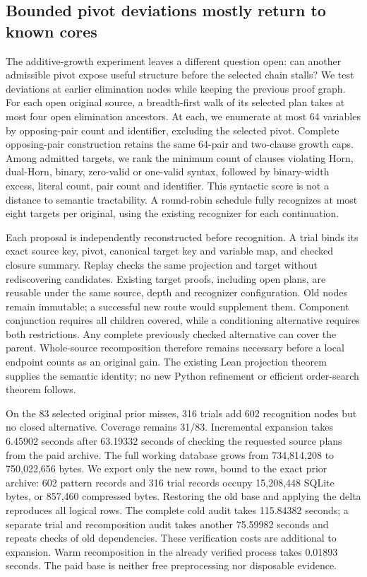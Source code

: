 \documentclass[11pt,a4paper]{article}
\numberwithin{equation}{section}
\theoremstyle{plain}
\theoremstyle{definition}
\theoremstyle{remark}
\begin{document}
\subsection{Bounded pivot deviations mostly return to known cores}
\label{sec:pivot-alternatives}

The additive-growth experiment leaves a different question open: can another admissible pivot expose useful structure before the selected chain stalls? We test deviations at earlier elimination nodes while keeping the previous proof graph. For each open original source, a breadth-first walk of its selected plan takes at most four open elimination ancestors. At each, we enumerate at most 64 variables by opposing-pair count and identifier, excluding the selected pivot. Complete opposing-pair construction retains the same 64-pair and two-clause growth caps. Among admitted targets, we rank the minimum count of clauses violating Horn, dual-Horn, binary, zero-valid or one-valid syntax, followed by binary-width excess, literal count, pair count and identifier. This syntactic score is not a distance to semantic tractability. A round-robin schedule fully recognizes at most eight targets per original, using the existing recognizer for each continuation.

Each proposal is independently reconstructed before recognition. A trial binds its exact source key, pivot, canonical target key and variable map, and checked closure summary. Replay checks the same projection and target without rediscovering candidates. Existing target proofs, including open plans, are reusable under the same source, depth and recognizer configuration. Old nodes remain immutable; a successful new route would supplement them. Component conjunction requires all children covered, while a conditioning alternative requires both restrictions. Any complete previously checked alternative can cover the parent. Whole-source recomposition therefore remains necessary before a local endpoint counts as an original gain. The existing Lean projection theorem supplies the semantic identity; no new Python refinement or efficient order-search theorem follows.

On the 83 selected original prior misses, 316 trials add 602 recognition nodes but no closed alternative. Coverage remains 31/83. Incremental expansion takes 6.45902 seconds after 63.19332 seconds of checking the requested source plans from the paid archive. The full working database grows from 734,814,208 to 750,022,656 bytes. We export only the new rows, bound to the exact prior archive: 602 pattern records and 316 trial records occupy 15,208,448 SQLite bytes, or 857,460 compressed bytes. Restoring the old base and applying the delta reproduces all logical rows. The complete cold audit takes 115.84382 seconds; a separate trial and recomposition audit takes another 75.59982 seconds and repeats checks of old dependencies. These verification costs are additional to expansion. Warm recomposition in the already verified process takes 0.01893 seconds. The paid base is neither free preprocessing nor disposable evidence.
\end{document}
